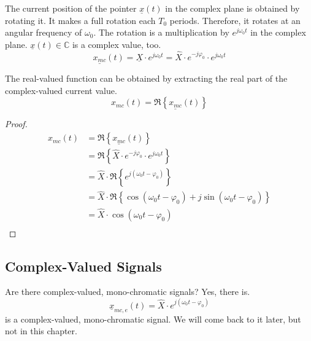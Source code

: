 \begin{refsection}
The current position of the pointer $\underline{x}(t)$ in the complex plane is obtained by rotating it. It makes a full rotation each $T_0$ periods. Therefore, it rotates at an angular frequency of $\omega_0$. The rotation is a multiplication by $e^{j \omega_0 t}$ in the complex plane. $\underline{x}(t) \in \mathbb{C}$ is a complex value, too.
\begin{equation}
	\underline{x_{mc}}(t) = \underline{X} \cdot e^{j \omega_0 t} = \hat{X} \cdot e^{-j \varphi_0} \cdot e^{j \omega_0 t}
\end{equation}

The real-valued function can be obtained by extracting the real part of the complex-valued current value.
\begin{equation}
	x_{mc}(t) = \Re\left\{\underline{x_{mc}}(t)\right\}
\end{equation}

\begin{proof}{}
	\begin{equation}
		\begin{split}
			x_{mc}(t) &= \Re\left\{\underline{x_{mc}}(t)\right\} \\
			 &= \Re\left\{\hat{X} \cdot e^{-j \varphi_0} \cdot e^{j \omega_0 t}\right\} \\
			 &= \hat{X} \cdot \Re\left\{e^{j \left(\omega_0 t - \varphi_0\right)}\right\} \\
			 &= \hat{X} \cdot \Re\left\{\cos \left(\omega_0 t - \varphi_0\right) + j \sin \left(\omega_0 t - \varphi_0\right)\right\} \\
			 &= \hat{X} \cdot \cos \left(\omega_0 t - \varphi_0\right) \\
		\end{split}
	\end{equation}
\end{proof}

\subsection{Complex-Valued Signals}

\begin{excursus}{Are there complex-valued, mono-chromatic signals?}
	Yes, there is.
	\begin{equation}
		\underline{x}_{mc,e}(t) = \hat{X} \cdot e^{j \left(\omega_0 t - \varphi_0\right)}
	\end{equation}
	is a complex-valued, mono-chromatic signal. We will come back to it later, but not in this chapter.
	

\end{excursus}
\end{refsection}
